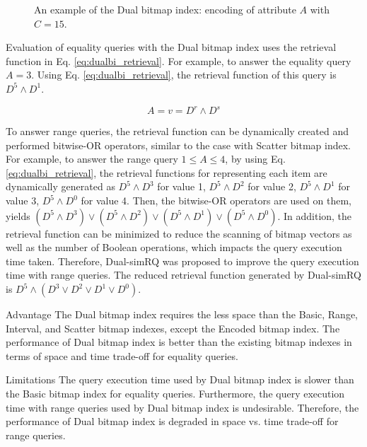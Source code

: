 \documentclass[../main/thesis.tex]{subfiles}
\begin{document}
\begin{figure}[ht]
	\centering
	\hfil
	\caption{An example of the Dual bitmap index: encoding of attribute $A$ with $C=15$.}
	\label{fig:example_dual}
\end{figure}

Evaluation of equality queries with the Dual bitmap index uses the retrieval function in Eq. \eqref{eq:dualbi_retrieval}. For example, to answer the equality query $A=3$. Using Eq. \eqref{eq:dualbi_retrieval}, the retrieval function of this query is $D^5 \wedge D^1$.

\begin{equation}
\label{eq:dualbi_retrieval}
A=v=D^r \wedge D^s
\end{equation}

To answer range queries, the retrieval function can be dynamically created and performed bitwise-OR operators, similar to the case with Scatter bitmap index. For example, to answer the range query $1 \leq A \leq 4$, by using Eq. \eqref{eq:dualbi_retrieval}, the retrieval functions for representing each item are dynamically generated as $D^5 \wedge D^3$ for value 1, $D^5 \wedge D^2$ for value 2, $D^5 \wedge D^1$ for value 3, $D^5 \wedge D^0$ for value 4. Then, the bitwise-OR operators are used on them, yields $(D^5 \wedge D^3) \vee (D^5 \wedge D^2) \vee (D^5 \wedge D^1) \vee (D^5 \wedge D^0)$. In addition, the retrieval function can be minimized to reduce the scanning of bitmap vectors as well as the number of Boolean operations, which impacts the query execution time taken. Therefore, Dual-simRQ \cite{Keawpibal2018Dual} was proposed to improve the query execution time with range queries. The reduced retrieval function generated by Dual-simRQ is $D^5 \wedge (D^3 \vee D^2 \vee D^1 \vee D^0)$.

\begin{prosNcons}{Advantage}
	The Dual bitmap index requires the less space than the Basic, Range, Interval, and Scatter bitmap indexes, except the Encoded bitmap index. The performance of Dual bitmap index is better than the existing bitmap indexes in terms of space and time trade-off for equality queries.
\end{prosNcons}

\begin{prosNcons}{Limitations}
	The query execution time used by Dual bitmap index is slower than the Basic bitmap index for equality queries. Furthermore, the query execution time with range queries used by Dual bitmap index is undesirable. Therefore, the performance of Dual bitmap index is degraded in space vs. time trade-off for range queries.
\end{prosNcons}
\end{document}

